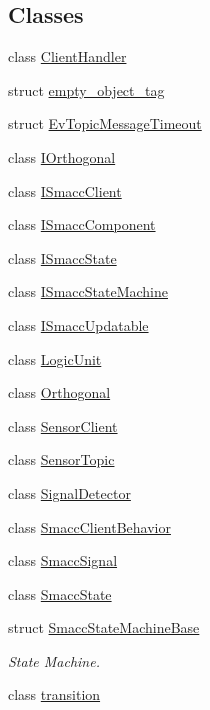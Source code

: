 \subsection*{Classes}
\begin{DoxyCompactItemize}
\item 
class \hyperlink{classsmacc_1_1ClientHandler}{Client\+Handler}
\item 
struct \hyperlink{structsmacc_1_1empty__object__tag}{empty\+\_\+object\+\_\+tag}
\item 
struct \hyperlink{structsmacc_1_1EvTopicMessageTimeout}{Ev\+Topic\+Message\+Timeout}
\item 
class \hyperlink{classsmacc_1_1IOrthogonal}{I\+Orthogonal}
\item 
class \hyperlink{classsmacc_1_1ISmaccClient}{I\+Smacc\+Client}
\item 
class \hyperlink{classsmacc_1_1ISmaccComponent}{I\+Smacc\+Component}
\item 
class \hyperlink{classsmacc_1_1ISmaccState}{I\+Smacc\+State}
\item 
class \hyperlink{classsmacc_1_1ISmaccStateMachine}{I\+Smacc\+State\+Machine}
\item 
class \hyperlink{classsmacc_1_1ISmaccUpdatable}{I\+Smacc\+Updatable}
\item 
class \hyperlink{classsmacc_1_1LogicUnit}{Logic\+Unit}
\item 
class \hyperlink{classsmacc_1_1Orthogonal}{Orthogonal}
\item 
class \hyperlink{classsmacc_1_1SensorClient}{Sensor\+Client}
\item 
class \hyperlink{classsmacc_1_1SensorTopic}{Sensor\+Topic}
\item 
class \hyperlink{classsmacc_1_1SignalDetector}{Signal\+Detector}
\item 
class \hyperlink{classsmacc_1_1SmaccClientBehavior}{Smacc\+Client\+Behavior}
\item 
class \hyperlink{classsmacc_1_1SmaccSignal}{Smacc\+Signal}
\item 
class \hyperlink{classsmacc_1_1SmaccState}{Smacc\+State}
\item 
struct \hyperlink{structsmacc_1_1SmaccStateMachineBase}{Smacc\+State\+Machine\+Base}
\begin{DoxyCompactList}\small\item\em State Machine. \end{DoxyCompactList}\item 
class \hyperlink{classsmacc_1_1transition}{transition}
\end{DoxyCompactItemize}
